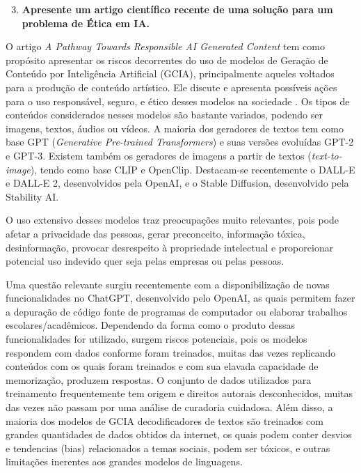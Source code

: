\begin{enumerate}\setcounter{enumi}{2}\bfseries
    \item  \textbf{Apresente um artigo científico recente de uma solução para um problema de Ética em IA.}
\end{enumerate}

O artigo \textit{A Pathway Towards Responsible AI Generated Content} tem como propósito apresentar 
os riscos decorrentes do uso de modelos de Geração de Conteúdo por Inteligência Artificial (GCIA), 
principalmente aqueles voltados para a produção de conteúdo artístico. 
Ele discute e apresenta possíveis ações para o uso responsável, seguro, e ético desses modelos na 
sociedade \cite{chen2023pathway}.
Os tipos de conteúdos considerados nesses modelos são bastante variados, podendo ser imagens, textos, 
áudios ou vídeos. A maioria dos geradores de textos tem como base GPT
(\textit{Generative Pre-trained Transformers}) e suas versões evoluídas GPT-2 e GPT-3. 
Existem também os geradores de imagens a partir de textos (\textit{text-to-image}), tendo  
como base CLIP e OpenClip. Destacam-se 
recentemente o DALL-E e DALL-E 2, desenvolvidos pela OpenAI, e o Stable Diffusion, desenvolvido pela 
Stability AI.

O uso extensivo desses modelos traz preocupações muito relevantes, pois pode afetar a privacidade das pessoas, 
gerar preconceito, informação tóxica, desinformação, provocar desrespeito à propriedade intelectual e 
proporcionar potencial uso indevido quer seja pelas empresas ou pelas pessoas. 

Uma questão relevante surgiu recentemente com a disponibilização de novas funcionalidades no ChatGPT, desenvolvido 
pelo OpenAI, as quais permitem fazer a depuração de código fonte de programas de 
computador ou elaborar trabalhos escolares/acadêmicos. Dependendo da forma como o produto dessas funcionalidades 
for utilizado, surgem riscos potenciais, pois os modelos respondem com dados conforme foram treinados, muitas das 
vezes replicando conteúdos com os quais foram treinados e com sua elavada capacidade de memorização, produzem respostas.
O conjunto de dados utilizados para treinamento frequentemente tem origem e direitos autorais desconhecidos,
muitas das vezes não passam por uma análise de curadoria cuidadosa. 
Além disso, a maioria dos modelos de GCIA decodificadores de textos são treinados com grandes quantidades 
de dados obtidos da internet, os quais podem conter desvios e tendencias (bias) relacionados a temas sociais, podem ser tóxicos, 
e outras limitações inerentes aos grandes modelos de linguagens.

